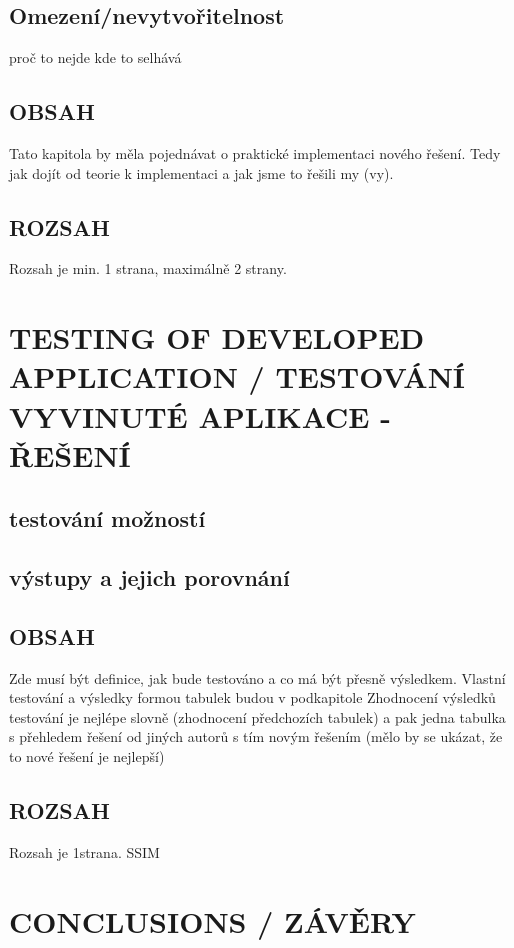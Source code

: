 \documentclass[journal]{IEEEtran}
\begin{document}
\subsection{Omezení/nevytvořitelnost}
proč to nejde
kde to selhává


\subsection{OBSAH}
Tato kapitola by měla pojednávat o praktické implementaci nového řešení. Tedy jak dojít od teorie k implementaci a jak jsme to řešili my (vy).
\subsection{ROZSAH}
Rozsah je min. 1 strana, maximálně 2 strany.





\section{TESTING OF DEVELOPED APPLICATION / TESTOVÁNÍ VYVINUTÉ APLIKACE - ŘEŠENÍ}

\subsection{testování možností}

\subsection{výstupy a jejich porovnání}

\subsection{OBSAH}
Zde musí být definice, jak bude testováno a co má být přesně výsledkem.
Vlastní testování a výsledky formou tabulek budou v podkapitole
Zhodnocení výsledků testování je nejlépe slovně (zhodnocení předchozích tabulek) a pak jedna tabulka s přehledem řešení od jiných autorů s tím novým řešením (mělo by se ukázat, že to nové řešení je nejlepší)
\subsection{ROZSAH}
Rozsah je 1strana. \ac{SSIM}



\section{CONCLUSIONS / ZÁVĚRY}
\end{document}

